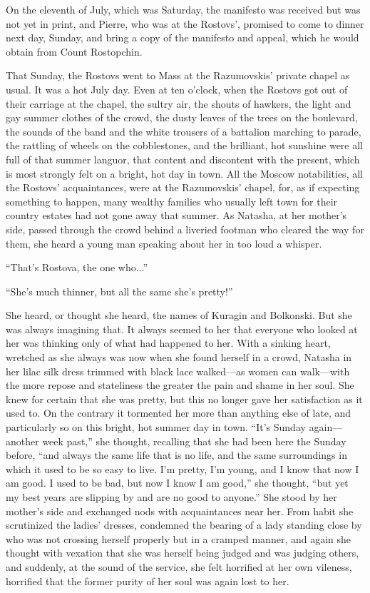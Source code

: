 On the eleventh of July, which was Saturday, the manifesto was
received but was not yet in print, and Pierre, who was at the
Rostovs', promised to come to dinner next day, Sunday, and bring
a copy of the manifesto and appeal, which he would obtain from
Count Rostopchin.

That Sunday, the Rostovs went to Mass at the Razumovskis' private
chapel as usual. It was a hot July day. Even at ten o'clock, when
the Rostovs got out of their carriage at the chapel, the sultry
air, the shouts of hawkers, the light and gay summer clothes of
the crowd, the dusty leaves of the trees on the boulevard, the
sounds of the band and the white trousers of a battalion marching
to parade, the rattling of wheels on the cobblestones, and the
brilliant, hot sunshine were all full of that summer languor,
that content and discontent with the present, which is most
strongly felt on a bright, hot day in town. All the Moscow
notabilities, all the Rostovs' acquaintances, were at the
Razumovskis' chapel, for, as if expecting something to happen,
many wealthy families who usually left town for their country
estates had not gone away that summer. As Natasha, at her
mother's side, passed through the crowd behind a liveried footman
who cleared the way for them, she heard a young man speaking
about her in too loud a whisper.

``That's Rostova, the one who...''

``She's much thinner, but all the same she's pretty!''

She heard, or thought she heard, the names of Kuragin and
Bolkonski. But she was always imagining that. It always seemed to
her that everyone who looked at her was thinking only of what had
happened to her. With a sinking heart, wretched as she always was
now when she found herself in a crowd, Natasha in her lilac silk
dress trimmed with black lace walked---as women can walk---with
the more repose and stateliness the greater the pain and shame in
her soul. She knew for certain that she was pretty, but this no
longer gave her satisfaction as it used to. On the contrary it
tormented her more than anything else of late, and particularly
so on this bright, hot summer day in town. ``It's Sunday
again---another week past,'' she thought, recalling that she had
been here the Sunday before, ``and always the same life that is
no life, and the same surroundings in which it used to be so easy
to live. I'm pretty, I'm young, and I know that now I am good. I
used to be bad, but now I know I am good,'' she thought, ``but
yet my best years are slipping by and are no good to anyone.''
She stood by her mother's side and exchanged nods with
acquaintances near her. From habit she scrutinized the ladies'
dresses, condemned the bearing of a lady standing close by who
was not crossing herself properly but in a cramped manner, and
again she thought with vexation that she was herself being judged
and was judging others, and suddenly, at the sound of the
service, she felt horrified at her own vileness, horrified that
the former purity of her soul was again lost to her.


